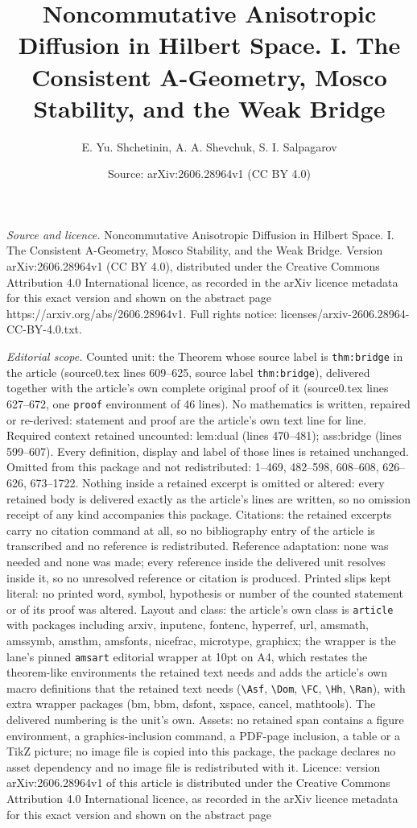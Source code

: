 \documentclass[10pt,a4paper]{amsart}
\title[Noncommutative Anisotropic Diffusion in Hilbert Space. I. Th]{Noncommutative Anisotropic Diffusion in Hilbert Space. I. The Consistent A-Geometry, Mosco Stability, and the Weak Bridge}
\author{E. Yu. Shchetinin, A. A. Shevchuk, S. I. Salpagarov}
\date{Source: arXiv:2606.28964v1 (CC BY 4.0)}
\begin{document}
\maketitle

\noindent\emph{Source and licence.} Noncommutative Anisotropic Diffusion in Hilbert Space. I. The Consistent A-Geometry, Mosco Stability, and the Weak Bridge. Version arXiv:2606.28964v1 (CC BY 4.0), distributed under the Creative Commons Attribution 4.0 International licence, as recorded in the arXiv licence metadata for this exact version and shown on the abstract page https://arxiv.org/abs/2606.28964v1. Full rights notice: licenses/arxiv-2606.28964-CC-BY-4.0.txt.\par\smallskip

\noindent\textit{Editorial scope.} Counted unit: the Theorem whose source label is \texttt{thm:bridge} in the article (source0.tex lines 609--625, source label \texttt{thm:bridge}), delivered together with the article's own complete original proof of it (source0.tex lines 627--672, one \texttt{proof} environment of 46 lines). No mathematics is written, repaired or re-derived: statement and proof are the article's own text line for line. Required context retained uncounted: lem:dual (lines 470--481); ass:bridge (lines 599--607). Every definition, display and label of those lines is retained unchanged. Omitted from this package and not redistributed: 1--469, 482--598, 608--608, 626--626, 673--1722. Nothing inside a retained excerpt is omitted or altered: every retained body is delivered exactly as the article's lines are written, so no omission receipt of any kind accompanies this package. Citations: the retained excerpts carry no citation command at all, so no bibliography entry of the article is transcribed and no reference is redistributed. Reference adaptation: none was needed and none was made; every reference inside the delivered unit resolves inside it, so no unresolved reference or citation is produced. Printed slips kept literal: no printed word, symbol, hypothesis or number of the counted statement or of its proof was altered. Layout and class: the article's own class is \texttt{article} with packages including arxiv, inputenc, fontenc, hyperref, url, amsmath, amssymb, amsthm, amsfonts, nicefrac, microtype, graphicx; the wrapper is the lane's pinned \texttt{amsart} editorial wrapper at 10pt on A4, which restates the theorem-like environments the retained text needs and adds the article's own macro definitions that the retained text needs (\texttt{\textbackslash Asf}, \texttt{\textbackslash Dom}, \texttt{\textbackslash FC}, \texttt{\textbackslash Hh}, \texttt{\textbackslash Ran}), with extra wrapper packages (bm, bbm, dsfont, xspace, cancel, mathtools). The delivered numbering is the unit's own. Assets: no retained span contains a figure environment, a graphics-inclusion command, a PDF-page inclusion, a table or a TikZ picture; no image file is copied into this package, the package declares no asset dependency and no image file is redistributed with it. Licence: version arXiv:2606.28964v1 of this article is distributed under the Creative Commons Attribution 4.0 International licence, as recorded in the arXiv licence metadata for this exact version and shown on the abstract page 
\end{document}
